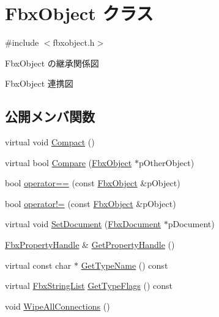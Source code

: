 \hypertarget{class_fbx_object}{}\section{Fbx\+Object クラス}
\label{class_fbx_object}


{\ttfamily \#include $<$fbxobject.\+h$>$}



Fbx\+Object の継承関係図


Fbx\+Object 連携図
\subsection*{公開メンバ関数}
\begin{DoxyCompactItemize}
\item 
virtual void \hyperlink{class_fbx_object_a2720f16a08150d162242b0c59f58c3dc}{Compact} ()
\item 
virtual bool \hyperlink{class_fbx_object_a49a593ea33e629adfac89c3238838144}{Compare} (\hyperlink{class_fbx_object}{Fbx\+Object} $\ast$p\+Other\+Object)
\item 
bool \hyperlink{class_fbx_object_affe87473b7a6485c7c7ad6e4184a0cad}{operator==} (const \hyperlink{class_fbx_object}{Fbx\+Object} \&p\+Object)
\item 
bool \hyperlink{class_fbx_object_a9bdaa7d7553dc65fde0138f0e60be723}{operator!=} (const \hyperlink{class_fbx_object}{Fbx\+Object} \&p\+Object)
\item 
virtual void \hyperlink{class_fbx_object_a5f01a45e03bbf2c243ae9ef71d9050cf}{Set\+Document} (\hyperlink{class_fbx_document}{Fbx\+Document} $\ast$p\+Document)
\item 
\hyperlink{class_fbx_property_handle}{Fbx\+Property\+Handle} \& \hyperlink{class_fbx_object_a779778f1761213ed413fa55c0b540d8e}{Get\+Property\+Handle} ()
\item 
virtual const char $\ast$ \hyperlink{class_fbx_object_a817dcfa8f7f7e2437324e1e71377c4b2}{Get\+Type\+Name} () const
\item 
virtual \hyperlink{class_fbx_string_list}{Fbx\+String\+List} \hyperlink{class_fbx_object_a6d30a5d00400039a248977cf9f9255b2}{Get\+Type\+Flags} () const
\item 
void \hyperlink{class_fbx_object_a57545454bba422674d78b805dca43409}{Wipe\+All\+Connections} ()
\end{DoxyCompactItemize}
